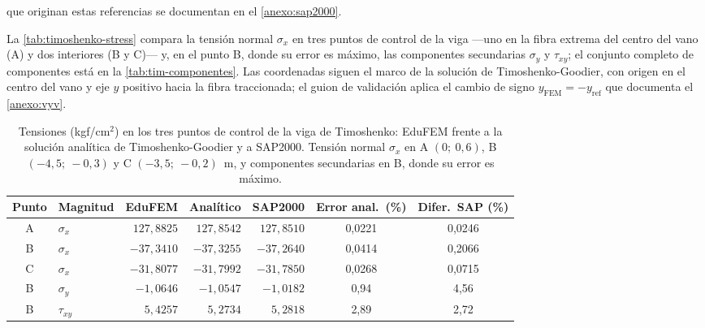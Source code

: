 que originan estas referencias se documentan en el \autoref{anexo:sap2000}.

La \autoref{tab:timoshenko-stress} compara la tensión normal $\sigma_x$ en tres puntos de control de la viga —uno en la fibra extrema del centro del vano (A) y dos interiores (B y C)— y, en el punto B, donde su error es máximo, las componentes secundarias $\sigma_y$ y $\tau_{xy}$; el conjunto completo de componentes está en la \autoref{tab:tim-componentes}. Las coordenadas siguen el marco de la solución de Timoshenko-Goodier, con origen en el centro del vano y eje $y$ positivo hacia la fibra traccionada; el guion de validación aplica el cambio de signo $y_{\text{FEM}} = -y_{\text{ref}}$ que documenta el \autoref{anexo:vyv}.

\begin{table}[htbp]
\centering
\caption[Tensiones (kgf/cm$^2$) en los puntos de control de la viga de Timoshenko: EduFEM frente a la solución analítica y a SAP2000.]{Tensiones (kgf/cm$^2$) en los tres puntos de control de la viga de Timoshenko: EduFEM frente a la solución analítica de Timoshenko-Goodier y a SAP2000. Tensión normal $\sigma_x$ en A $(0;\ 0{,}6)$, B $(-4{,}5;\ -0{,}3)$ y C $(-3{,}5;\ -0{,}2)$~m, y componentes secundarias en B, donde su error es máximo.}
\label{tab:timoshenko-stress}
\small
\setlength{\tabcolsep}{4pt}
\begin{tabular}{c l r r r c c}
\hline
Punto & Magnitud & EduFEM & Analítico & SAP2000 & Error anal.\ (\%) & Difer.\ SAP (\%) \\
\hline
A & $\sigma_x$   & $127{,}8825$ & $127{,}8542$ & $127{,}8510$ & 0,0221 & 0,0246 \\
B & $\sigma_x$   & $-37{,}3410$ & $-37{,}3255$ & $-37{,}2640$ & 0,0414 & 0,2066 \\
C & $\sigma_x$   & $-31{,}8077$ & $-31{,}7992$ & $-31{,}7850$ & 0,0268 & 0,0715 \\
B & $\sigma_y$   & $-1{,}0646$  & $-1{,}0547$  & $-1{,}0182$  & 0,94   & 4,56 \\
B & $\tau_{xy}$  & $5{,}4257$   & $5{,}2734$   & $5{,}2818$   & 2,89   & 2,72 \\
\hline
\end{tabular}
{\singlespacing{}}
\end{table}


